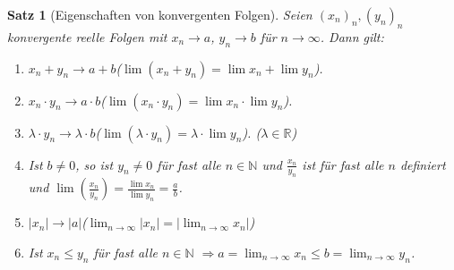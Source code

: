 \documentclass[11pt, twoside, a4paper]{article}
\theoremstyle{plain}
\newtheorem{satz}[blockelement]{Satz}
\newcommand{\pair}[1]{\left(#1\right)}
\newcommand{\abs}[1]{\left|#1\right|}
\newcommand{\impl}[0]{\Rightarrow{}}
\newcommand{\fromto}{\rightarrow{}}
\newcommand{\naturalnumbers}{\mathbb{N}}
\newcommand{\realnumbers}{\mathbb{R}}
\begin{document}
    \begin{satz}[Eigenschaften von konvergenten Folgen]
        Seien $(x_n)_n, (y_n)_n$ konvergente reelle Folgen mit $x_n\fromto a$, $y_n\fromto b$ für $n\fromto\infty$. Dann gilt:
        \begin{enumerate}[label=(\alph*)]
            \item $x_n+y_n\fromto a+b$\quad ($\lim\pair{x_n+y_n}=\lim x_n + \lim y_n$).
            \item $x_n\cdot y_n \fromto a\cdot b$\quad ($\lim\pair{x_n\cdot y_n} = \lim x_n \cdot \lim y_n$).
            \item $\lambda\cdot y_n \fromto \lambda\cdot b$\quad ($\lim\pair{\lambda\cdot y_n} = \lambda \cdot \lim y_n$). ($\lambda\in\realnumbers$)
            \item Ist $b\neq 0$, so ist $y_n \neq 0$ für fast alle $n\in\naturalnumbers$ und $\frac{x_n}{y_n}$ ist für fast alle $n$ definiert und $\lim\pair{\frac{x_n}{y_n}} = \frac{\lim x_n}{\lim y_n} = \frac{a}{b}$.
            \item $\abs{x_n} \fromto \abs{a}$\quad ($\lim_{n\fromto \infty} \abs{x_n} = \abs{\lim_{n\fromto \infty} x_n}$)
            \item Ist $x_n \leq y_n$ für fast alle $n\in\naturalnumbers$ $\impl a = \lim_{n\fromto \infty} x_n \leq b = \lim_{n\fromto \infty} y_n$.
        \end{enumerate}


\end{satz}
\end{document}
